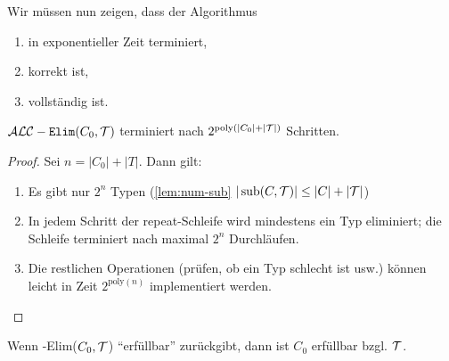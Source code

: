 Wir müssen nun zeigen, dass der Algorithmus
\begin{enumerate}
    \item in exponentieller Zeit terminiert,
    \item korrekt ist,
    \item vollständig ist.
\end{enumerate}

\begin{lemma}
    $\mathcal{A}\mathcal{L}\mathcal{C}-\texttt{Elim}(C_0,\mathcal{T})$ terminiert nach $2^{\text{poly}(|C_0|+|\mathcal{T}|)}$ Schritten.
\end{lemma}

\begin{proof}
Sei $n = \left| C_{0} \right| + |T|$. Dann gilt:

\begin{enumerate}
\item Es gibt nur $2^{n}$ Typen (\autoref{lem:num-sub} $|\operatorname{sub}(C, \mathcal{T})| \leq |C| + |\mathcal{T}|$)
\item
  In jedem Schritt der repeat-Schleife wird mindestens ein Typ
  eliminiert; die Schleife terminiert nach maximal $2^{n}$
  Durchläufen.
\item
  Die restlichen Operationen (prüfen, ob ein Typ schlecht ist usw.)
  können leicht in Zeit $2^{\text{poly}\left( n \right)}$ implementiert werden.
\end{enumerate}
\end{proof}

\begin{lemma}
    Wenn \ALC-Elim($C_0,\mathcal{T}$) \enquote{erfüllbar} zurückgibt, dann ist $C_0$ erfüllbar bzgl. $\mathcal{T}$.
\end{lemma}

